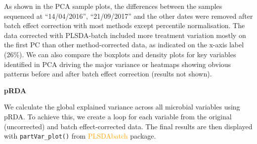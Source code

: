 \documentclass[
]{book}
\begin{document}
As shown in the PCA sample plots, the differences between the samples sequenced at ``14/04/2016'', ``21/09/2017'' and the other dates were removed after batch effect correction with most methods except percentile normalisation. The data corrected with PLSDA-batch included more treatment variation mostly on the first PC than other method-corrected data, as indicated on the x-axis label (26\%). We can also compare the boxplots and density plots for key variables identified in PCA driving the major variance or heatmaps showing obvious patterns before and after batch effect correction (results not shown).

\textbf{pRDA}

We calculate the global explained variance across all microbial variables using pRDA. To achieve this, we create a loop for each variable from the original (uncorrected) and batch effect-corrected data. The final results are then displayed with \texttt{partVar\_plot()} from \textcolor{orange}{PLSDAbatch} package.
\end{document}
